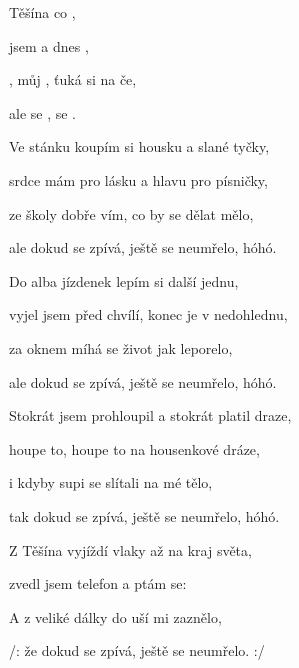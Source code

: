 

\zs
{} Těšína   co ,   

 jsem  a  dnes ,    

 , můj , ťuká si na če,

ale  se ,  se .     
\ks

\zs
Ve stánku koupím si housku a slané tyčky,

srdce mám pro lásku a hlavu pro písničky,

ze školy dobře vím, co by se dělat mělo,

ale dokud se zpívá, ještě se neumřelo, hóhó.
\ks

\zs
Do alba jízdenek lepím si další jednu,

vyjel jsem před chvílí, konec je v nedohlednu,

za oknem míhá se život jak leporelo,

ale dokud se zpívá, ještě se neumřelo, hóhó.
\ks

\zs
Stokrát jsem prohloupil a stokrát platil draze,

houpe to, houpe to na housenkové dráze,

i kdyby supi se slítali na mé tělo,

tak dokud se zpívá, ještě se neumřelo, hóhó.
\ks

\zs
Z Těšína vyjíždí vlaky až na kraj světa,

zvedl jsem telefon a ptám se: 

A z veliké dálky do uší mi zaznělo,

/: že dokud se zpívá, ještě se neumřelo. :/
\ks

\kp





